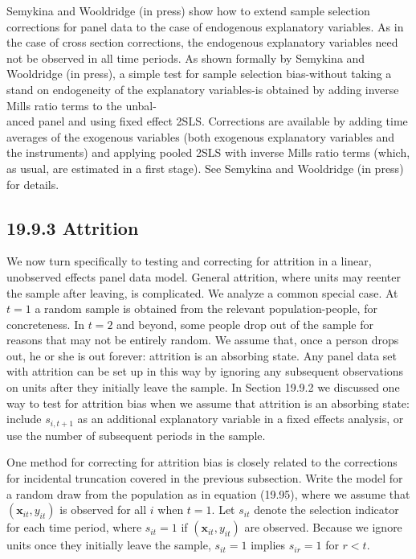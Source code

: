 \documentclass[10pt]{article}
\begin{document}
Semykina and Wooldridge (in press) show how to extend sample selection corrections for panel data to the case of endogenous explanatory variables. As in the case of cross section corrections, the endogenous explanatory variables need not be observed in all time periods. As shown formally by Semykina and Wooldridge (in press), a simple test for sample selection bias-without taking a stand on endogeneity of the explanatory variables-is obtained by adding inverse Mills ratio terms to the unbal-\\
anced panel and using fixed effect 2SLS. Corrections are available by adding time averages of the exogenous variables (both exogenous explanatory variables and the instruments) and applying pooled 2SLS with inverse Mills ratio terms (which, as usual, are estimated in a first stage). See Semykina and Wooldridge (in press) for details.

\subsection*{19.9.3 Attrition}
We now turn specifically to testing and correcting for attrition in a linear, unobserved effects panel data model. General attrition, where units may reenter the sample after leaving, is complicated. We analyze a common special case. At $t=1$ a random sample is obtained from the relevant population-people, for concreteness. In $t=2$ and beyond, some people drop out of the sample for reasons that may not be entirely random. We assume that, once a person drops out, he or she is out forever: attrition is an absorbing state. Any panel data set with attrition can be set up in this way by ignoring any subsequent observations on units after they initially leave the sample. In Section 19.9.2 we discussed one way to test for attrition bias when we assume that attrition is an absorbing state: include $s_{i, t+1}$ as an additional explanatory variable in a fixed effects analysis, or use the number of subsequent periods in the sample.

One method for correcting for attrition bias is closely related to the corrections for incidental truncation covered in the previous subsection. Write the model for a random draw from the population as in equation (19.95), where we assume that $\left(\mathbf{x}_{i t}, y_{i t}\right)$ is observed for all $i$ when $t=1$. Let $s_{i t}$ denote the selection indicator for each time period, where $s_{i t}=1$ if $\left(\mathbf{x}_{i t}, y_{i t}\right)$ are observed. Because we ignore units once they initially leave the sample, $s_{i t}=1$ implies $s_{i r}=1$ for $r<t$.
\end{document}
